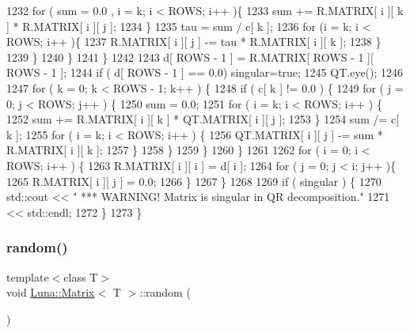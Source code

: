 \begin{DoxyCode}
1232           \textcolor{keywordflow}{for} ( sum = 0.0 , i = k; i < ROWS; i++ )\{
1233             sum += R.MATRIX[ i ][ k ] * R.MATRIX[ i ][ j ];
1234           \}
1235           tau = sum / c[ k ];
1236           \textcolor{keywordflow}{for} (i = k; i < ROWS; i++ )\{
1237             R.MATRIX[ i ][ j ] -= tau * R.MATRIX[ i ][ k ];
1238           \}
1239         \}
1240       \}
1241     \}
1242 
1243     d[ ROWS - 1 ] = R.MATRIX[ ROWS - 1 ][ ROWS - 1 ];
1244     \textcolor{keywordflow}{if} ( d[ ROWS - 1 ] == 0.0) singular=\textcolor{keyword}{true};
1245     QT.eye();
1246 
1247     \textcolor{keywordflow}{for} ( k = 0; k < ROWS - 1; k++ ) \{
1248       \textcolor{keywordflow}{if} ( c[ k ] != 0.0 ) \{
1249         \textcolor{keywordflow}{for} ( j = 0; j < ROWS; j++ ) \{
1250           sum = 0.0;
1251           \textcolor{keywordflow}{for} ( i = k; i < ROWS; i++ ) \{
1252             sum += R.MATRIX[ i ][ k ] * QT.MATRIX[ i ][ j ];
1253           \}
1254           sum /= c[ k ];
1255           \textcolor{keywordflow}{for} ( i = k; i < ROWS; i++ ) \{
1256             QT.MATRIX[ i ][ j ] -= sum * R.MATRIX[ i ][ k ];
1257           \}
1258         \}
1259       \}
1260     \}
1261 
1262     \textcolor{keywordflow}{for} ( i = 0; i < ROWS; i++ ) \{
1263       R.MATRIX[ i ][ i ] = d[ i ];
1264       \textcolor{keywordflow}{for} ( j = 0; j < i; j++ )\{
1265         R.MATRIX[ i ][ j ] = 0.0;
1266       \}
1267     \}
1268 
1269     \textcolor{keywordflow}{if} ( singular ) \{
1270       std::cout << \textcolor{stringliteral}{" *** WARNING! Matrix is singular in QR decomposition."}
1271                 << std::endl;
1272     \}
1273   \}
\end{DoxyCode}
\mbox{\label{classLuna_1_1Matrix_a6edd17298f4543e51bc0957fcb78c6f0}} 
\subsubsection{\texorpdfstring{random()}{random()}\hspace{0.1cm}{\footnotesize\ttfamily [1/3]}}
{\footnotesize\ttfamily template$<$class T$>$ \\
void \hyperlink{classLuna_1_1Matrix}{Luna\+::\+Matrix}$<$ T $>$\+::random (\begin{DoxyParamCaption}{ }\end{DoxyParamCaption})}



